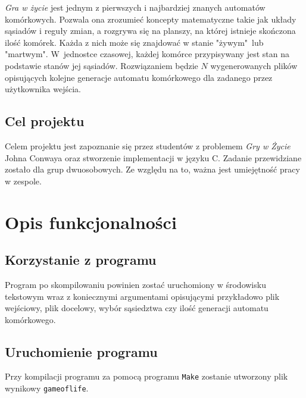 \documentclass[a4paper,12pt]{article}
\begin{document}
\textit{Gra w życie} jest jednym z pierwszych i najbardziej znanych automatów komórkowych. Pozwala ona zrozumieć koncepty matematyczne takie jak układy sąsiadów i reguły zmian, a rozgrywa się na planszy, na której istnieje skończona ilość komórek. Każda z nich może się znajdować w stanie "żywym"\ lub "martwym". W~jednostce czasowej, każdej komórce przypisywany jest stan na podstawie stanów jej sąsiadów. Rozwiązaniem będzie $N$ wygenerowanych plików opisujących kolejne generacje automatu komórkowego dla zadanego przez użytkownika wejścia.

\subsection{Cel projektu}
Celem projektu jest zapoznanie się przez studentów z problemem \textit{Gry w Życie} Johna Conwaya oraz stworzenie implementacji w języku C. Zadanie przewidziane zostało dla grup dwuosobowych. Ze względu na to, ważna jest umiejętność pracy w zespole.

\section{Opis funkcjonalności}

\subsection{Korzystanie z programu}
Program po skompilowaniu powinien zostać uruchomiony w środowisku tekstowym wraz z koniecznymi argumentami opisującymi przykładowo plik wejściowy, plik docelowy, wybór sąsiedztwa czy ilość generacji automatu komórkowego.

\subsection{Uruchomienie programu}
Przy kompilacji programu za pomocą programu \texttt{Make} zostanie utworzony plik wynikowy \texttt{gameoflife}.
\end{document}
